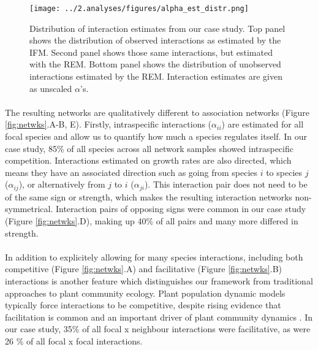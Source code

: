 \documentclass[a4,12pt]{article}
\begin{document}
    \begin{figure}[H]
        \texttt{[image: ../2.analyses/figures/alpha\_est\_distr.png]}
        \caption{Distribution of interaction estimates from our case study. Top panel shows the distribution of observed interactions as estimated by the IFM. Second panel shows those same interactions, but estimated with the REM. Bottom panel shows the distribution of unobserved interactions estimated by the REM. Interaction estimates are given as unscaled \(\alpha\)'s.}
        \label{fig:adist}
    \end{figure}




    \paragraph{}
    The resulting networks are qualitatively different to association networks (Figure \ref{fig:netwks}.A-B, E). Firstly, intraspecific interactions ($\alpha_{ii}$) are estimated for all focal species and allow us to quantify how much a species regulates itself. In our case study, 85\% of all species across all network samples showed intraspecific competition. Interactions estimated on growth rates are also directed, which means they have an associated direction such as going from species $i$ to species $j$ ($\alpha_{ij}$), or alternatively from $j$ to $i$ ($\alpha_{ji}$). This interaction pair does not need to be of the same sign or strength, which makes the resulting interaction networks non-symmetrical. Interaction pairs of opposing signs were common in our case study (Figure \ref{fig:netwks}.D), making up 40\% of all pairs and many more differed in strength. 

    \paragraph{}
    In addition to explicitely allowing for many species interactions, including both competitive (Figure \ref{fig:netwks}.A) and facilitative (Figure \ref{fig:netwks}.B) interactions is another feature which distinguishes our framework from traditional approaches to plant community ecology. Plant population dynamic models typically force interactions to be competitive, despite rising evidence that facilitation is common and an important driver of plant community dynamics \citep{Brooker2008a}. In our case study, 35\% of all focal x neighbour interactions were facilitative, as were 26 \% of all focal x focal interactions.
\end{document}
